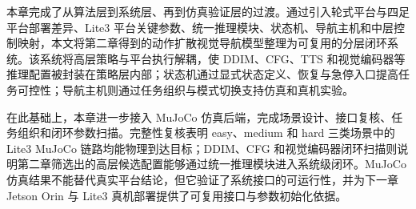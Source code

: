 本章完成了从算法层到系统层、再到仿真验证层的过渡。通过引入轮式平台与四足平台部署差异、Lite3 平台关键参数、统一推理模块、状态机、导航主机和中层控制映射，本文将第二章得到的动作扩散视觉导航模型整理为可复用的分层闭环系统。该系统将高层策略与平台执行解耦，使 DDIM、CFG、TTS 和视觉编码器等推理配置被封装在策略层内部；状态机通过显式状态定义、恢复与急停入口提高任务可控性；导航主机则通过任务组织与模式切换支持仿真和真机实验。

在此基础上，本章进一步接入 MuJoCo 仿真后端，完成场景设计、接口复核、任务组织和闭环参数扫描。完整性复核表明 easy、medium 和 hard 三类场景中的 Lite3 MuJoCo 链路均能物理到达目标；DDIM、CFG 和视觉编码器闭环扫描则说明第二章筛选出的高层候选配置能够通过统一推理模块进入系统级闭环。MuJoCo 仿真结果不能替代真实平台结论，但它验证了系统接口的可运行性，并为下一章 Jetson Orin 与 Lite3 真机部署提供了可复用接口与参数初始化依据。
